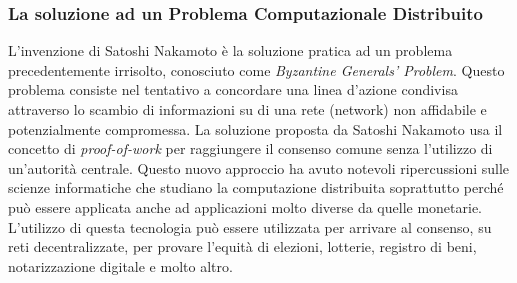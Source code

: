 \subsubsection{La soluzione ad un Problema Computazionale Distribuito}
L'invenzione di Satoshi Nakamoto è la soluzione pratica ad un problema precedentemente irrisolto, conosciuto come \textit{Byzantine Generals' Problem}. Questo problema consiste nel tentativo a concordare una linea d'azione condivisa attraverso lo scambio di informazioni su di una rete (network) non affidabile e potenzialmente compromessa. La soluzione proposta da Satoshi Nakamoto usa il concetto di \textit{proof-of-work} per raggiungere il consenso comune senza l'utilizzo di un'autorità centrale. Questo nuovo approccio ha avuto notevoli ripercussioni sulle scienze informatiche che studiano la computazione distribuita soprattutto perché può essere applicata anche ad applicazioni molto diverse da quelle monetarie. L'utilizzo di questa tecnologia può essere utilizzata per arrivare al consenso, su reti decentralizzate, per provare l'equità di elezioni, lotterie, registro di beni, notarizzazione digitale e molto altro.

